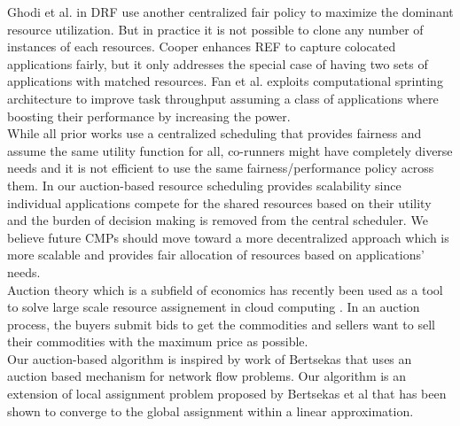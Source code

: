 \indent Ghodi et al. in DRF \cite{ghodsi2011dominant} use another centralized fair policy to maximize the dominant resource utilization. But in practice it is not possible to clone any number of instances of each resources. %
Cooper \cite{llull2017cooper} enhances REF to capture colocated applications fairly, but it only addresses the special case of having two sets of applications with matched resources. Fan et al. \cite{fan2016computational} exploits computational sprinting architecture to improve task throughput assuming a class of applications where boosting their performance by increasing the power. \\
\indent While all prior works use a centralized scheduling that provides fairness and assume the same utility function for all, co-runners might have completely diverse needs and it is not efficient to use the same fairness/performance policy across them. 
In our auction-based resource scheduling provides scalability since individual applications compete for the shared resources based on their utility and the burden of decision making is removed from the central scheduler. We believe future CMPs should move toward a more decentralized approach which is more scalable and provides fair allocation of resources based on applications' needs. \\ 
\indent Auction theory which is a subfield of economics has recently been used as a tool to solve large scale resource assignement in cloud computing \cite{krishna2009auction, parsons2011auctions}. In an auction process, the buyers submit bids to get the commodities and sellers want to sell their commodities with the maximum price as possible. \\
\indent Our auction-based algorithm is inspired by work of Bertsekas \cite{bertsekas1998network} that uses an auction based mechanism for network flow problems. Our algorithm is an extension of local assignment problem proposed by Bertsekas et al that has been shown to converge to the global assignment within a linear approximation.
